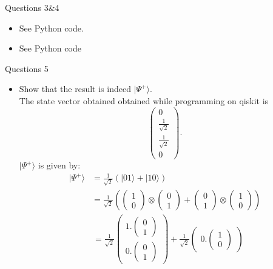 \documentclass[12pt]{beamer}
\newcommand{\ket}[1]{|#1\rangle}
\newcommand{\eqt}[1]
{\begin{equation}#1
\end{equation}}
\newcommand{\eqtt}[1]
{\begin{equation} \begin{split}#1
\end{split}\end{equation}}
\begin{document}
\begin{frame}{Questions 3\&4}
	\begin{itemize}
\item See Python code. 
\item See Python code 
\end{itemize}
\end{frame}
\begin{frame}[allowframebreaks]{Questions 5}
	\begin{itemize}
		\item Show that the result is indeed $\ket{\Psi^+}$.\\
		The state vector obtained obtained while programming on qiskit is
		\eqt{\begin{pmatrix}
				0\\
				\frac{1}{\sqrt{2}}\\
				\frac{1}{\sqrt{2}}\\
				0
			\end{pmatrix}.}
		$\ket{\Psi^+}$ is given by:
		\eqtt{
			\ket{\Psi^+}&=\frac{1}{\sqrt{2}}\left( \ket{01}+\ket{10}\right) \\
			&=\frac{1}{\sqrt{2}} \left(\begin{pmatrix}
				1\\
				0
			\end{pmatrix}\otimes\begin{pmatrix}
				0\\
				1
			\end{pmatrix}+\begin{pmatrix}
				0\\
				1
			\end{pmatrix}\otimes\begin{pmatrix}
				1\\
				0
			\end{pmatrix}\right)}
		\eqtt{
			&=\frac{1}{\sqrt{2}}\begin{pmatrix}
				1.\begin{pmatrix}
					0\\
					1
				\end{pmatrix}\\
				0.\begin{pmatrix}
					0\\
					1\end{pmatrix}\end{pmatrix}+\frac{1}{\sqrt{2}}\begin{pmatrix}
				0.\begin{pmatrix}
					1\\
					0

\end{pmatrix}
\end{pmatrix}}
\end{itemize}
\end{frame}
\end{document}
